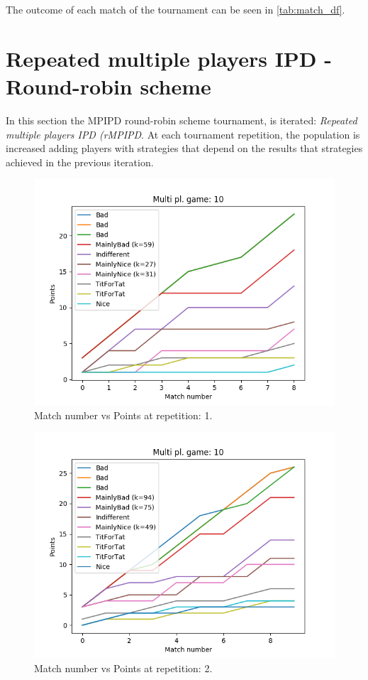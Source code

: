 \documentclass[journal,a4paper,10pt,twoside,draft]{IEEEtran}
\begin{document}
The outcome of each match of the tournament can be seen in \autoref{tab:match_df}.

\newpage
\section{Repeated multiple players IPD - Round-robin scheme} \label{rIPDMP}
In this section the MPIPD round-robin scheme tournament, is iterated: \textit{Repeated multiple players IPD (rMPIPD}.
At each tournament repetition, the population is increased adding players with strategies that depend on the results that strategies achieved in the previous iteration. 

\begin{figure}
    \centering
    \includegraphics[width=1\columnwidth]{../img_v1/ridpmp-scores-10-r0.png}
    \caption{Match number vs Points at repetition: 1.}
    \label{fig:rmpipd1}
\end{figure}

\begin{figure}
    \centering
    \includegraphics[width=1\columnwidth]{../img_v1/ridpmp-scores-10-r1.png}
    \caption{Match number vs Points at repetition: 2.}
    \label{fig:rmpipd2}
\end{figure}
\end{document}

